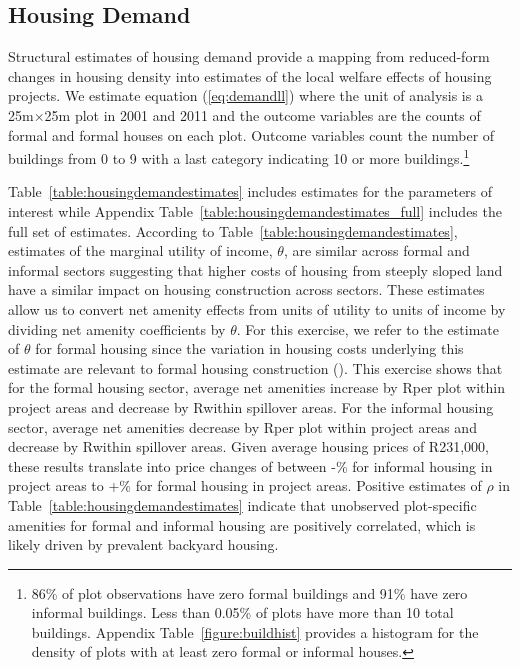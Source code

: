 \documentclass[12pt]{article}
\begin{document}
\subsection{Housing Demand}\label{section:demandestimates}

Structural estimates of housing demand provide a mapping from reduced-form changes in housing density into estimates of the local welfare effects of housing projects.  We estimate equation (\ref{eq:demandll}) where the unit of analysis is a 25m$\times$25m plot in 2001 and 2011 and the outcome variables are the counts of formal and formal houses on each plot.  Outcome variables count the number of buildings from 0 to 9 with a last category indicating 10 or more buildings.\footnote{86\% of plot observations have zero formal buildings and 91\% have zero informal buildings.  Less than 0.05\% of plots have more than 10 total buildings.  Appendix Table~\ref{figure:buildhist} provides a histogram for the density of plots with at least zero formal or informal houses.}  

Table~\ref{table:housingdemandestimates} includes estimates for the parameters of interest while Appendix Table~\ref{table:housingdemandestimates_full} includes the full set of estimates.  According to Table~\ref{table:housingdemandestimates}, estimates of the marginal utility of income, $\theta$, are similar across formal and informal sectors suggesting that higher costs of housing from steeply sloped land have a similar impact on housing construction across sectors.  These estimates allow us to convert net amenity effects from units of utility to units of income by dividing net amenity coefficients by $\theta$.  For this exercise, we refer to the estimate of $\theta$ for formal housing since the variation in housing costs underlying this estimate are relevant to formal housing construction (\cite{redbook}).  This exercise shows that for the formal housing sector, average net amenities increase by Rper plot within project areas and decrease by Rwithin spillover areas.  For the informal housing sector, average net amenities decrease by Rper plot within project areas and decrease by Rwithin spillover areas.  Given average housing prices of R231,000, these results translate into price changes of between -\unskip\% for informal housing in project areas to +\unskip\% for formal housing in project areas.  Positive estimates of $\rho$ in Table~\ref{table:housingdemandestimates} indicate that unobserved plot-specific amenities for formal and informal housing are positively correlated, which is likely driven by prevalent backyard housing.
\end{document}
